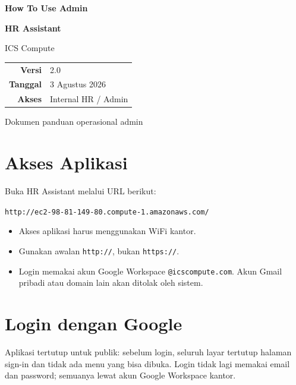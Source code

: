 \documentclass[11pt,a4paper]{article}
\begin{document}
\begin{titlepage}
  \centering
  \vspace*{2.2cm}
  {\Huge\bfseries How To Use Admin\par}
  \vspace{0.4cm}
  {\Huge\bfseries \textcolor{icsred}{HR Assistant}\par}
  \vspace{0.9cm}
  {\Large ICS Compute\par}
  \vfill
  \begin{tabular}{>{\bfseries}rl}
    Versi & 2.0 \\
    Tanggal & 3 Agustus 2026 \\
    Akses & Internal HR / Admin \\
  \end{tabular}
  \vfill
  {\large Dokumen panduan operasional admin\par}
\end{titlepage}

\tableofcontents
\newpage

\section{Akses Aplikasi}

Buka HR Assistant melalui URL berikut:

\begin{center}
\texttt{http://ec2-98-81-149-80.compute-1.amazonaws.com/}
\end{center}

\begin{itemize}
  \item Akses aplikasi harus menggunakan WiFi kantor.
  \item Gunakan awalan \texttt{http://}, bukan \texttt{https://}.
  \item Login memakai akun Google Workspace \texttt{@icscompute.com}. Akun Gmail
        pribadi atau domain lain akan ditolak oleh sistem.
\end{itemize}

\section{Login dengan Google}

Aplikasi tertutup untuk publik: sebelum login, seluruh layar tertutup halaman
sign-in dan tidak ada menu yang bisa dibuka. Login tidak lagi memakai email dan
password; semuanya lewat akun Google Workspace kantor.
\end{document}
